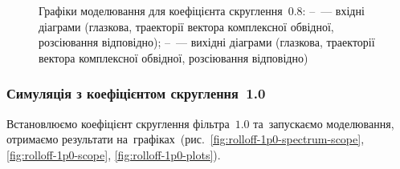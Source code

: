 \documentclass[
	a4paper,
	oneside,
	BCOR = 10mm,
	DIV = 12,
	12pt,
	headings = normal,
]{scrartcl}
\begin{document}
\begin{figure}[!htbp]
\begin{subfigure}{\textwidth / 3}
						\caption{}
						\label{subfig:rolloff-0p8-scatter-plot-out}
					\end{subfigure}%
					\caption{Графіки моделювання для коефіцієнта скруглення~$0.8$: –~— вхідні діаграми (глазкова, траекторії вектора комплексної обвідної, розсіювання відповідно); –~— вихідні діаграми (глазкова, траекторії вектора комплексної обвідної, розсіювання відповідно)}
					\label{fig:rolloff-0p8-plots}
				\end{figure}

			\clearpage
			\subsubsection{Симуляція з коефіцієнтом скруглення~1.0}
				Встановлюємо коефіцієнт скруглення фільтра~$1.0$ та~запускаємо моделювання, отримаємо результати на~графіках~(рис.~\ref{fig:rolloff-1p0-spectrum-scope}, \ref{fig:rolloff-1p0-scope}, \ref{fig:rolloff-1p0-plots}).
\end{document}
